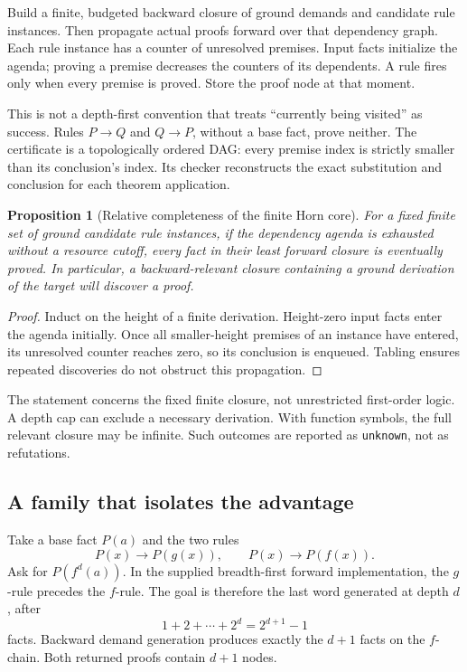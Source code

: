 \documentclass[11pt,a4paper]{article}
\newcommand{\code}[1]{\texttt{\small #1}}
\newtheorem{proposition}{Proposition}[section]
\begin{document}
Build a finite, budgeted backward closure of ground demands and candidate rule
instances. Then propagate actual proofs forward over that dependency graph.
Each rule instance has a counter of unresolved premises. Input facts initialize
the agenda; proving a premise decreases the counters of its dependents. A rule
fires only when every premise is proved. Store the proof node at that moment.

This is not a depth-first convention that treats ``currently being visited''
as success. Rules $P\to Q$ and $Q\to P$, without a base fact, prove neither.
The certificate is a topologically ordered DAG: every premise index is strictly
smaller than its conclusion's index. Its checker reconstructs the exact
substitution and conclusion for each theorem application.

\begin{proposition}[Relative completeness of the finite Horn core]
For a fixed finite set of ground candidate rule instances, if the dependency
agenda is exhausted without a resource cutoff, every fact in their least
forward closure is eventually proved. In particular, a backward-relevant
closure containing a ground derivation of the target will discover a proof.
\end{proposition}
\begin{proof}
Induct on the height of a finite derivation. Height-zero input facts enter the
agenda initially. Once all smaller-height premises of an instance have entered,
its unresolved counter reaches zero, so its conclusion is enqueued. Tabling
ensures repeated discoveries do not obstruct this propagation.
\end{proof}

The statement concerns the fixed finite closure, not unrestricted first-order
logic. A depth cap can exclude a necessary derivation. With function symbols,
the full relevant closure may be infinite. Such outcomes are reported as
\code{unknown}, not as refutations.

\subsection{A family that isolates the advantage}

Take a base fact $P(a)$ and the two rules
\[
 P(x)\to P(g(x)),\qquad P(x)\to P(f(x)).
\]
Ask for $P(f^d(a))$. In the supplied breadth-first forward implementation, the
$g$-rule precedes the $f$-rule. The goal is therefore the last word generated at
depth $d$, after
\[
 1+2+\cdots+2^d=2^{d+1}-1
\]
facts. Backward demand generation produces exactly the $d+1$ facts on the
$f$-chain. Both returned proofs contain $d+1$ nodes.
\end{document}
